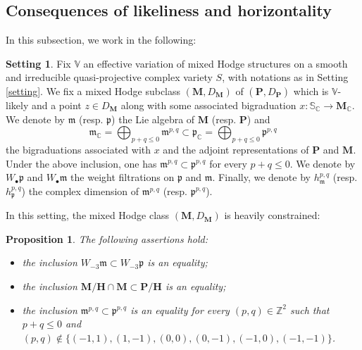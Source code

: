 \documentclass[10pt]{article}
\numberwithin{equation}{subsection}
\theoremstyle{plain}
\newtheorem{proposition}[theorem]{Proposition}
\theoremstyle{definition}
\newtheorem{setting}[theorem]{Setting}
\theoremstyle{remark}
\newcommand{\Z}{\mathbb Z}
\newcommand{\C}{\mathbb C}
\newcommand{\V}{\mathbb V}
\newcommand{\s}{\mathbb S}
\newcommand{\pp}{\mathbf P}
\newcommand{\mon}{\mathbf H}
\newcommand{\M}{\mathbf M}
\newcommand{\bul}{\bullet}
\newcommand{\para}{\mathfrak{p}}
\newcommand{\mt}{\mathfrak{m}}
\begin{document}
\subsection{Consequences of likeliness and horizontality}
In this subsection, we work in the following:
\begin{setting}\label{settingext}
Fix $\V$ an effective variation of mixed Hodge structures on a smooth and irreducible quasi-projective complex variety $S$, with notations as in Setting \ref{setting}. We fix a mixed Hodge subclass $(\M,D_\M)$ of $(\pp, D_\pp)$ which is $\V$-likely and a point $z \in D_\M$ along with some associated bigraduation $x : \s_\C \rightarrow \M_\C$. We denote by $\mt$ (resp. $\para$) the Lie algebra of $\M$ (resp. $\pp$) and
\[
\mt_\C = \bigoplus_{p+q \leqslant 0} \mt^{p,q} \subset \para_\C = \bigoplus_{p+q \leqslant 0} \para^{p,q}
\]
the bigraduations associated with $x$ and the adjoint representations of $\pp$ and $\M$. Under the above inclusion, one has $\mt^{p,q} \subset \para^{p,q}$ for every $p+q \leqslant 0$. We denote by $W_\bul \para$ and $W_\bul \mt$ the weight filtrations on $\para$ and $\mt$. Finally, we denote by $h_{\mt}^{p,q}$ (resp. $h_\para^{p,q}$) the complex dimension of $\mt^{p,q}$ (resp. $\para^{p,q}$).
\end{setting}
In this setting, the mixed Hodge class $(\M,D_\M)$ is heavily constrained:
\begin{proposition}\label{likconstr}
The following assertions hold:
\begin{itemize}
\item[(i)] the inclusion $W_{-3} \mt \subset W_{-3} \para$ is an equality;
\item[(ii)] the inclusion $\M/ \mon \cap \M \subset \pp/\mon$ is an equality;
\item[(iii)] the inclusion $\mt^{p,q} \subset \para^{p,q}$ is an equality for every $(p,q) \in \Z^2$ such that $p+q \leqslant 0$ and $(p,q) \notin \{(-1,1), (1,-1), (0,0), (0,-1), (-1, 0), (-1, -1)\}$.
\end{itemize}
\end{proposition}
\end{document}
